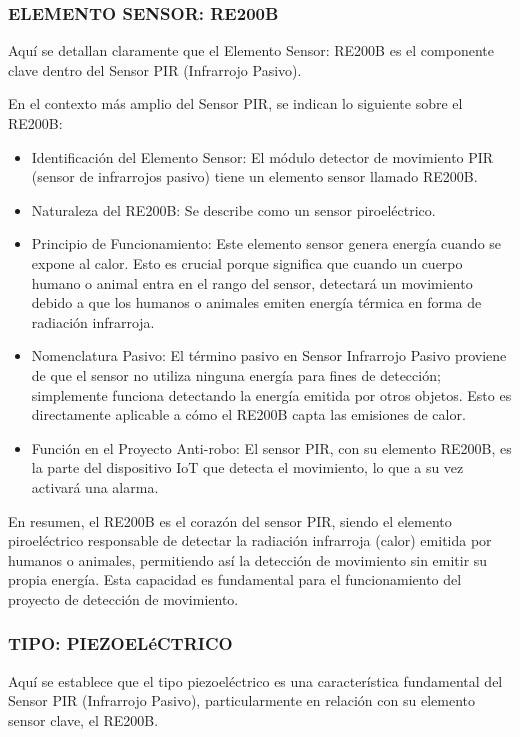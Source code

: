 \documentclass{report}
\begin{document}
\subsubsection{ELEMENTO SENSOR: RE200B}
 Aquí se detallan claramente que el Elemento Sensor: RE200B es el componente clave dentro del 
Sensor PIR (Infrarrojo Pasivo).

En el contexto más amplio del Sensor PIR, se  indican lo siguiente sobre el RE200B:
\begin{itemize}
    \item Identificación del Elemento Sensor: El módulo detector de movimiento PIR (sensor de infrarrojos pasivo) tiene un elemento sensor llamado RE200B.
    \item Naturaleza del RE200B: Se describe como un sensor piroeléctrico.
    \item Principio de Funcionamiento: Este elemento sensor genera energía cuando se expone al calor. Esto es crucial porque significa que cuando un 
    cuerpo humano o animal entra en el rango del sensor, detectará un movimiento debido a que los humanos o animales emiten energía térmica en forma 
    de radiación infrarroja.
    \item Nomenclatura Pasivo: El término pasivo en Sensor Infrarrojo Pasivo proviene de que el sensor no utiliza ninguna energía para fines de 
    detección; simplemente funciona detectando la energía emitida por otros objetos. Esto es directamente aplicable a cómo el RE200B capta las 
    emisiones de calor.
    \item Función en el Proyecto Anti-robo: El sensor PIR, con su elemento RE200B, es la parte del dispositivo IoT que detecta el 
    movimiento, lo que a su vez activará una alarma.
\end{itemize}
En resumen, el RE200B es el corazón del sensor PIR, siendo el elemento piroeléctrico responsable de detectar la radiación infrarroja (calor) emitida 
por humanos o animales, permitiendo así la detección de movimiento sin emitir su propia energía. Esta capacidad es fundamental para el funcionamiento 
del proyecto de detección de movimiento.

\subsubsection{TIPO: PIEZOELéCTRICO}
Aquí se establece que el tipo piezoeléctrico es una característica fundamental del Sensor PIR (Infrarrojo 
Pasivo), particularmente en relación con su elemento sensor clave, el RE200B.
\end{document}
